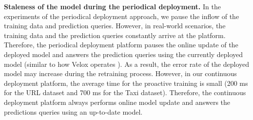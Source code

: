 \textbf{Staleness of the model during the periodical deployment.}
In the experiments of the periodical deployment approach, we pause the inflow of the training data and prediction queries.
However, in real-world scenarios, the training data and the prediction queries constantly arrive at the platform.
Therefore, the periodical deployment platform pauses the online update of the deployed model and answers the prediction queries using the currently deployed model (similar to how Velox operates \cite{crankshaw2014missing}).
As a result, the error rate of the deployed model may increase during the retraining process.
However, in our continuous deployment platform, the average time for the proactive training is small (200 ms for the URL dataset and 700 ms for the Taxi dataset).
Therefore, the continuous deployment platform always performs online model update and answers the predictions queries using an up-to-date model.